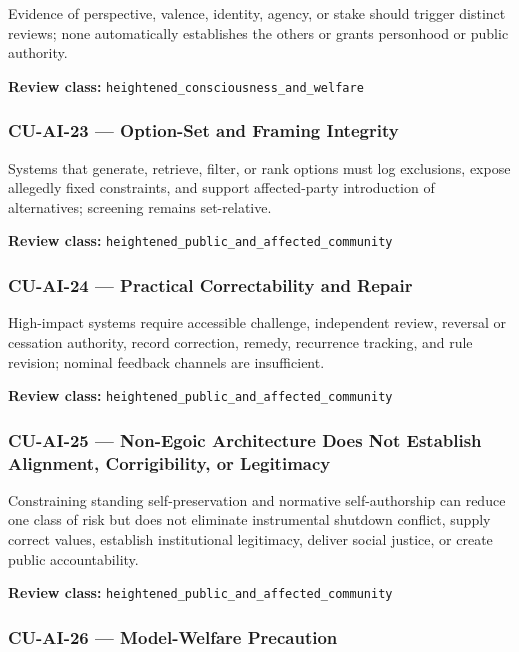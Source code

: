 \documentclass[
  11pt,
]{article}
\begin{document}
Evidence of perspective, valence, identity, agency, or stake should
trigger distinct reviews; none automatically establishes the others or
grants personhood or public authority.

\textbf{Review class:} \texttt{heightened\_consciousness\_and\_welfare}

\subsubsection{CU-AI-23 --- Option-Set and Framing
Integrity}\label{cu-ai-23-option-set-and-framing-integrity}

Systems that generate, retrieve, filter, or rank options must log
exclusions, expose allegedly fixed constraints, and support
affected-party introduction of alternatives; screening remains
set-relative.

\textbf{Review class:}
\texttt{heightened\_public\_and\_affected\_community}

\subsubsection{CU-AI-24 --- Practical Correctability and
Repair}\label{cu-ai-24-practical-correctability-and-repair}

High-impact systems require accessible challenge, independent review,
reversal or cessation authority, record correction, remedy, recurrence
tracking, and rule revision; nominal feedback channels are insufficient.

\textbf{Review class:}
\texttt{heightened\_public\_and\_affected\_community}

\subsubsection{CU-AI-25 --- Non-Egoic Architecture Does Not Establish
Alignment, Corrigibility, or
Legitimacy}\label{cu-ai-25-non-egoic-architecture-does-not-establish-alignment-corrigibility-or-legitimacy}

Constraining standing self-preservation and normative self-authorship
can reduce one class of risk but does not eliminate instrumental
shutdown conflict, supply correct values, establish institutional
legitimacy, deliver social justice, or create public accountability.

\textbf{Review class:}
\texttt{heightened\_public\_and\_affected\_community}

\subsubsection{CU-AI-26 --- Model-Welfare
Precaution}\label{cu-ai-26-model-welfare-precaution}
\end{document}
